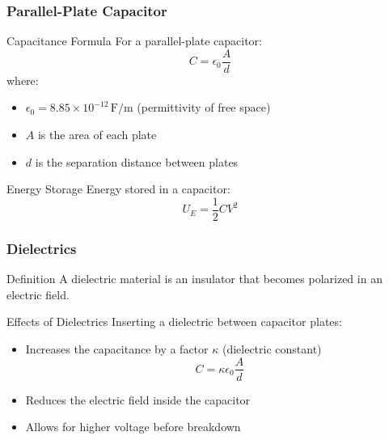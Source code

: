 \documentclass{beamer}
\begin{document}
\begin{frame}
    \frametitle{Parallel-Plate Capacitor}
    \begin{block}{Capacitance Formula}
        For a parallel-plate capacitor:
        \begin{equation}
            C = \epsilon_0 \frac{A}{d}
        \end{equation}
        where:
        \begin{itemize}
            \item $\epsilon_0 = 8.85 \times 10^{-12} \, \text{F/m}$ (permittivity of free space)
            \item $A$ is the area of each plate
            \item $d$ is the separation distance between plates
        \end{itemize}
    \end{block}
    
    \begin{block}{Energy Storage}
        Energy stored in a capacitor:
        \begin{equation}
            U_E = \frac{1}{2}CV^2
        \end{equation}
    \end{block}
\end{frame}

\begin{frame}
    \frametitle{Dielectrics}
    \begin{block}{Definition}
        A dielectric material is an insulator that becomes polarized in an electric field.
    \end{block}
    
    \begin{block}{Effects of Dielectrics}
        Inserting a dielectric between capacitor plates:
        \begin{itemize}
            \item Increases the capacitance by a factor $\kappa$ (dielectric constant)
            \begin{equation}
                C = \kappa \epsilon_0 \frac{A}{d}
            \end{equation}
            \item Reduces the electric field inside the capacitor
            \item Allows for higher voltage before breakdown
        \end{itemize}
    \end{block}
    \end{frame}
\end{document}
